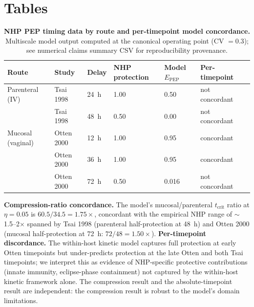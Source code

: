 \documentclass[11pt]{article}
\theoremstyle{definition}
\theoremstyle{remark}
\newcommand{\Epep}{E_{\text{PEP}}}
\newcommand{\tcrit}{t_{\text{crit}}}
\begin{document}
\clearpage
\section*{Tables}

\begin{table}[H]
\centering
\caption{\textbf{NHP PEP timing data by route and per-timepoint model concordance.} Multiscale model output computed at the canonical operating point (CV $= 0.3$); see numerical claims summary CSV for reproducibility provenance.}
\label{tab:nhp}
\small
\begin{tabular}{@{}llllllc@{}}
\toprule
\textbf{Route} & \textbf{Study} & \textbf{Delay} & \textbf{NHP protection} & \textbf{Model $\Epep$} & \textbf{Per-timepoint} \\
\midrule
Parenteral (IV)   & Tsai 1998\cite{tsai1995}    & 24~h & 1.00 & 0.50 & not concordant \\
                  & Tsai 1998                   & 48~h & 0.50 & 0.00 & not concordant \\
Mucosal (vaginal) & Otten 2000\cite{otten2000}  & 12~h & 1.00 & 0.95 & concordant \\
                  & Otten 2000                  & 36~h & 1.00 & 0.95 & concordant \\
                  & Otten 2000                  & 72~h & 0.50 & 0.016 & not concordant \\
\bottomrule
\end{tabular}

\vspace{0.3em}
\footnotesize
\textbf{Compression-ratio concordance.} The model's mucosal/parenteral $\tcrit$ ratio at $\eta = 0.05$ is $60.5/34.5 = 1.75\times$, concordant with the empirical NHP range of $\sim$1.5--2$\times$ spanned by Tsai 1998 (parenteral half-protection at 48~h) and Otten 2000 (mucosal half-protection at 72~h: $72/48 = 1.50\times$). \textbf{Per-timepoint discordance.} The within-host kinetic model captures full protection at early Otten timepoints but under-predicts protection at the late Otten and both Tsai timepoints; we interpret this as evidence of NHP-specific protective contributions (innate immunity, eclipse-phase containment) not captured by the within-host kinetic framework alone. The compression result and the absolute-timepoint result are independent: the compression result is robust to the model's domain limitations.
\end{table}
\end{document}
